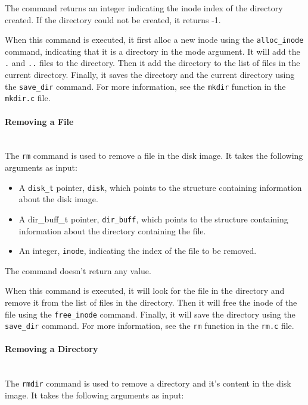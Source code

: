 \documentclass{article}
\begin{document}
The command returns an integer indicating the inode index of the directory created. If the directory could not be created, it returns -1.

When this command is executed, it first alloc a new inode using the \texttt{alloc\_inode} command, indicating that it is a directory in the mode argument. It will add the \texttt{.} and \texttt{..} files to the directory. Then it add the directory to the list of files in the current directory. Finally, it saves the directory and the current directory using the \texttt{save\_dir} command. For more information, see the \texttt{mkdir} function in the \texttt{mkdir.c} file.

\paragraph{Removing a File}\mbox{}\\
The \texttt{rm} command is used to remove a file in the disk image. It takes the following arguments as input:

\begin{itemize}
    \item A \texttt{disk\_t} pointer, \texttt{disk}, which points to the structure containing information about the disk image.
    \item A dir\_buff\_t pointer, \texttt{dir\_buff}, which points to the structure containing information about the directory containing the file.
    \item An integer, \texttt{inode}, indicating the index of the file to be removed.
\end{itemize}

The command doesn't return any value.

When this command is executed, it will look for the file in the directory and remove it from the list of files in the directory. Then it will free the inode of the file using the \texttt{free\_inode} command. Finally, it will save the directory using the \texttt{save\_dir} command. For more information, see the \texttt{rm} function in the \texttt{rm.c} file.

\paragraph{Removing a Directory}\mbox{}\\
The \texttt{rmdir} command is used to remove a directory and it's content in the disk image. It takes the following arguments as input:
\end{document}
